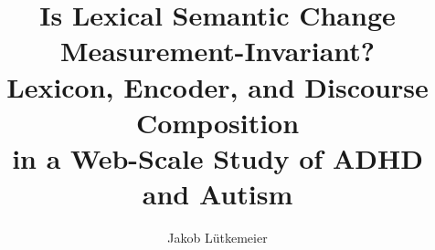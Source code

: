 \documentclass[final]{clv2025}
\begin{document}
\title{Is Lexical Semantic Change Measurement-Invariant?\\ Lexicon, Encoder, and Discourse Composition\\ in a Web-Scale Study of ADHD and Autism}

\author{Jakob L\"utkemeier}


\makeatletter
\providecommand{\@thefnmark}{}

\newcommand{\applabel}[1]{%
  \protected@edef\@currentlabel{\Alph{section}}%
  \label{#1}%
}

\let\cl@appendixsection\appendixsection
\renewcommand{\appendixsection}[1]{%
  \cl@appendixsection{#1}%
  \renewcommand{\theHtable}{\Alph{section}.\arabic{table}}%
  \renewcommand{\theHfigure}{\Alph{section}.\arabic{figure}}%
}
\makeatother

\maketitle
\end{document}
